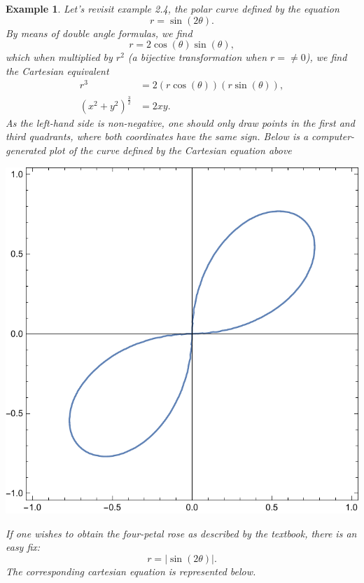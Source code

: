 \documentclass[11pt]{amsart}
\newtheorem{example}{Example}[section]
\numberwithin{equation}{section}
\begin{document}
\begin{example}
Let's revisit example 2.4, the polar curve defined by the equation
\begin{equation*}
r=\sin(2\theta).
\end{equation*}
By means of double angle formulas, we find
\begin{equation*}
r=2\cos(\theta)\sin(\theta),
\end{equation*}
which when multiplied by $r^2$ (a bijective transformation when $r=\neq0$), we find the Cartesian equivalent
\begin{align*}
r^3 & = 2(r\cos(\theta))(r\sin(\theta)), \\
(x^2+y^2)^{\frac{3}{2}} & = 2xy.
\end{align*}
As the left-hand side is non-negative, one should only draw points in the first and third quadrants, where both coordinates have the same sign. Below is a computer-generated plot of the curve defined by the Cartesian equation above
\begin{center}
\includegraphics[scale=0.4]{polar_p6.pdf}
\end{center} 
If one wishes to obtain the four-petal rose as described by the textbook, there is an easy fix:
\begin{equation*}
r=|\sin(2\theta)|.
\end{equation*}
The corresponding cartesian equation is represented below. 

\end{example}
\end{document}
